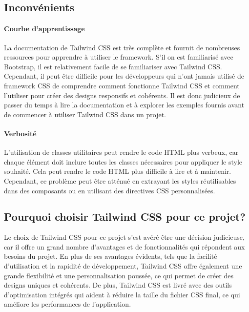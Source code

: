 \subsection{Inconvénients}

\paragraph{Courbe d'apprentissage}

La documentation de Tailwind CSS est très complète et fournit de nombreuses ressources pour apprendre à utiliser le framework. S'il on est familiarisé avec Bootstrap, il est relativement facile de se familiariser avec Tailwind CSS. Cependant, il peut être difficile pour les développeurs qui n'ont jamais utilisé de framework CSS de comprendre comment fonctionne Tailwind CSS et comment l'utiliser pour créer des designs responsifs et cohérents. Il est donc judicieux de passer du temps à lire la documentation et à explorer les exemples fournis avant de commencer à utiliser Tailwind CSS dans un projet.

\paragraph{Verbosité}

L'utilisation de classes utilitaires peut rendre le code HTML plus verbeux, car chaque élément doit inclure toutes les classes nécessaires pour appliquer le style souhaité. Cela peut rendre le code HTML plus difficile à lire et à maintenir. Cependant, ce problème peut être atténué en extrayant les styles réutilisables dans des composants ou en utilisant des directives CSS personnalisées.

\subsection{Pourquoi choisir Tailwind CSS pour ce projet?}

Le choix de Tailwind CSS pour ce projet s'est avéré être une décision judicieuse, car il offre un grand nombre d'avantages et de fonctionnalités qui répondent aux besoins du projet. En plus de ses avantages évidents, tels que la facilité d'utilisation et la rapidité de développement, Tailwind CSS offre également une grande flexibilité et une personnalisation poussée, ce qui permet de créer des designs uniques et cohérents. De plus, Tailwind CSS est livré avec des outils d'optimisation intégrés qui aident à réduire la taille du fichier CSS final, ce qui améliore les performances de l'application.